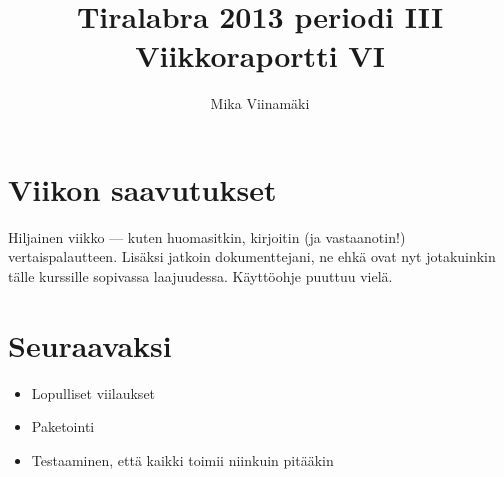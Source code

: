 \documentclass{article}
\begin{document}
\title{Tiralabra 2013 periodi III \\ Viikkoraportti VI}
\author{Mika Viinamäki}
\maketitle

\section{Viikon saavutukset}

Hiljainen viikko --- kuten huomasitkin, kirjoitin (ja vastaanotin!) vertaispalautteen. Lisäksi jatkoin dokumenttejani, ne ehkä ovat nyt jotakuinkin tälle kurssille sopivassa laajuudessa. Käyttöohje puuttuu vielä.

\section{Seuraavaksi}

\begin{itemize}
    \item Lopulliset viilaukset
    \item Paketointi
    \item Testaaminen, että kaikki toimii niinkuin pitääkin
\end{itemize}
\end{document}
